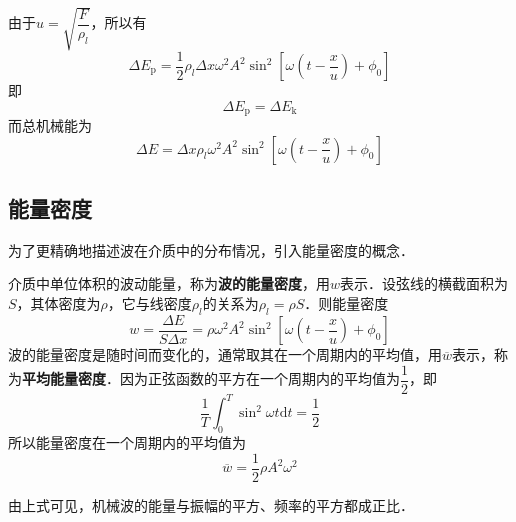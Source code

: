 由于$u=\sqrt{\dfrac{F}{\rho_{l}}}$，所以有
\begin{equation}
\Delta E_{\mathrm{p}}=\frac{1}{2} \rho_{l} \Delta x \omega^{2} A^{2} \sin ^{2}\left[\omega\left(t-\frac{x}{u}\right)+\phi_{0}\right]
\end{equation}
即
\begin{equation}
\Delta E_{\mathrm{p}}=\Delta E_{\mathrm{k}}
\end{equation}
而总机械能为
\begin{equation}
\Delta E=\Delta x \rho_{l} \omega^{2} A^{2} \sin ^{2}\left[\omega\left(t-\frac{x}{u}\right)+\phi_{0}\right]
\end{equation}

\subsection{能量密度}

为了更精确地描述波在介质中的分布情况，引入能量密度的概念．

介质中单位体积的波动能量，称为\textbf{波的能量密度}，用$w$表示．设弦线的横截面积为$S$，其体密度为$\rho$，它与线密度$\rho_l$的关系为$\rho_l=\rho S$．则能量密度
\begin{equation}
w=\frac{\Delta E}{S \Delta x}=\rho \omega^{2} A^{2} \sin ^{2}\left[\omega\left(t-\frac{x}{u}\right)+\phi_{0}\right]
\end{equation}
波的能量密度是随时间而变化的，通常取其在一个周期内的平均值，用$\overline w$表示，称为\textbf{平均能量密度}．因为正弦函数的平方在一个周期内的平均值为$\dfrac 12$，即
\begin{equation}
\frac{1}{T} \int_{0}^{T} \sin ^{2} \omega t \mathrm{d} t=\frac{1}{2}
\end{equation}
所以能量密度在一个周期内的平均值为
\begin{equation}
\overline{w}=\frac{1}{2} \rho A^{2} \omega^{2}
\end{equation}

由上式可见，机械波的能量与振幅的平方、频率的平方都成正比．